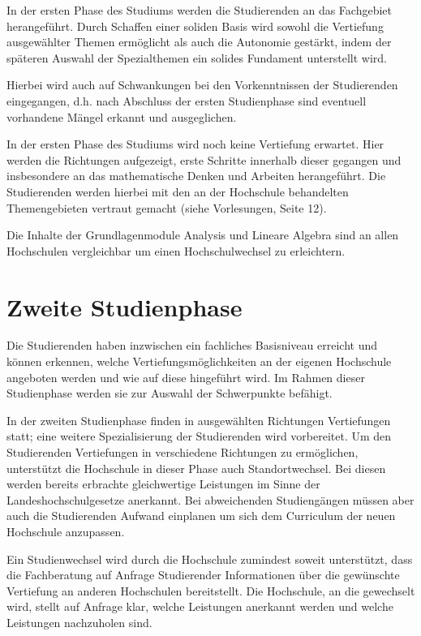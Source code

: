 In der ersten Phase des Studiums werden die Studierenden an das Fachgebiet herangeführt. Durch Schaffen einer soliden Basis wird sowohl die Vertiefung ausgewählter Themen ermöglicht als auch die Autonomie gestärkt, indem der späteren Auswahl der Spezialthemen ein solides Fundament unterstellt wird.

Hierbei wird auch auf Schwankungen bei den Vorkenntnissen der Studierenden eingegangen, d.h. nach Abschluss der ersten Studienphase sind eventuell vorhandene Mängel erkannt und ausgeglichen.

In der ersten Phase des Studiums wird noch keine Vertiefung erwartet. Hier werden die Richtungen aufgezeigt, erste Schritte innerhalb dieser gegangen und insbesondere an das mathematische Denken und Arbeiten herangeführt. Die Studierenden werden hierbei mit den an der Hochschule behandelten Themengebieten vertraut gemacht (siehe Vorlesungen, Seite 12). 

Die Inhalte der Grundlagenmodule Analysis und Lineare Algebra sind an allen Hochschulen vergleichbar um einen Hochschulwechsel zu erleichtern.

\section{Zweite Studienphase}

Die Studierenden haben inzwischen ein fachliches Basisniveau erreicht und können erkennen, welche Vertiefungsmöglichkeiten an der eigenen Hochschule angeboten werden und wie auf diese hingeführt wird. Im Rahmen dieser Studienphase werden sie zur Auswahl der Schwerpunkte befähigt.

In der zweiten Studienphase finden in ausgewählten Richtungen Vertiefungen statt; eine weitere Spezialisierung der Studierenden wird vorbereitet. Um den Studierenden Vertiefungen in verschiedene Richtungen zu ermöglichen, unterstützt die Hochschule in dieser Phase auch Standortwechsel. Bei diesen werden bereits erbrachte gleichwertige Leistungen im Sinne der Landeshochschulgesetze anerkannt. Bei abweichenden Studiengängen müssen aber auch die Studierenden Aufwand einplanen um sich dem Curriculum der neuen Hochschule anzupassen.

Ein Studienwechsel wird durch die Hochschule zumindest soweit unterstützt, dass die Fachberatung auf Anfrage Studierender Informationen über die gewünschte Vertiefung an anderen Hochschulen bereitstellt. Die Hochschule, an die gewechselt wird, stellt auf Anfrage klar, welche Leistungen anerkannt werden und welche Leistungen nachzuholen sind.

